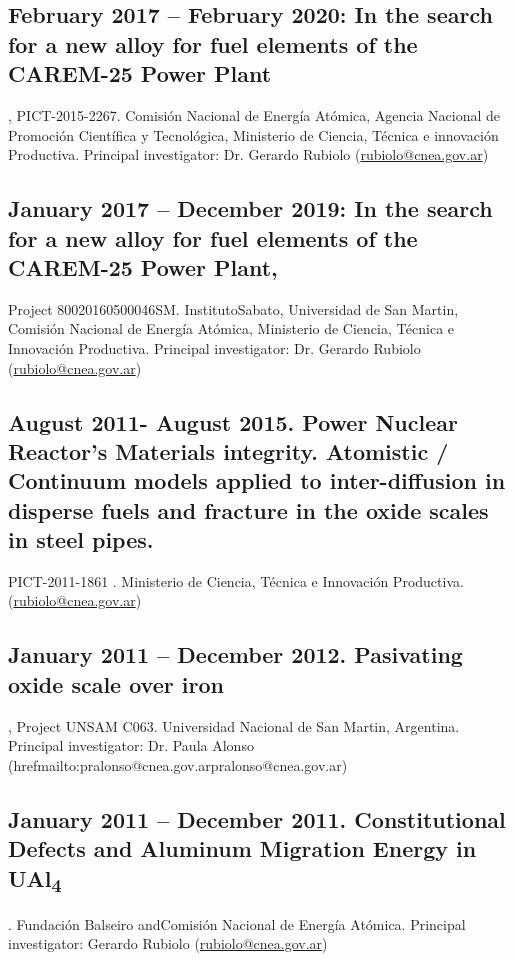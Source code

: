 \subsection{February 2017 – February 2020: In the search for a new alloy for
fuel elements of the CAREM-25 Power Plant}, PICT-2015-2267. Comisión Nacional de
Energía Atómica, Agencia Nacional de Promoción Científica y Tecnológica,
Ministerio de Ciencia, Técnica e innovación Productiva.
Principal investigator: Dr. Gerardo Rubiolo (\href{mailto:rubiolo@cnea.gov.ar}{rubiolo@cnea.gov.ar}) 

\subsection{January 2017 – December 2019: In the search for a new alloy for fuel
elements of the CAREM-25 Power Plant, }Project 80020160500046SM. InstitutoSabato,
Universidad de San Martin, Comisión Nacional de Energía Atómica, Ministerio de
Ciencia, Técnica e Innovación Productiva. Principal investigator: Dr. Gerardo Rubiolo 
(\href{mailto:rubiolo@cnea.gov.ar}{rubiolo@cnea.gov.ar})

\subsection{August 2011- August 2015. Power Nuclear Reactor’s Materials
integrity. Atomistic / Continuum models applied to inter-diffusion in disperse
fuels and fracture in the oxide scales in steel pipes.} PICT-2011-1861 .
Ministerio de Ciencia, Técnica e Innovación Productiva. (\href{mailto:rubiolo@cnea.gov.ar}{rubiolo@cnea.gov.ar})

\subsection{January 2011 – December 2012. Pasivating oxide scale over iron},
Project UNSAM C063. Universidad Nacional de San Martin, Argentina. 
Principal investigator: Dr. Paula Alonso (href{mailto:pralonso@cnea.gov.ar}{pralonso@cnea.gov.ar})

 \subsection{January 2011 – December 2011. Constitutional Defects and Aluminum
 Migration Energy in UAl\textsubscript{4}}. Fundación Balseiro andComisión
 Nacional de Energía Atómica. Principal investigator: Gerardo Rubiolo (\href{mailto:rubiolo@cnea.gov.ar}{rubiolo@cnea.gov.ar})

